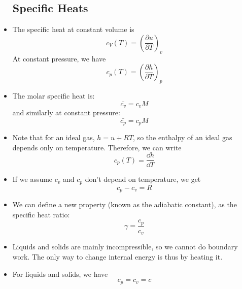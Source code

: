 \begin{itemize}
          \subsection{Specific Heats}
    \item The specific heat at constant volume is 
    \begin{equation}
        c_V(T) = \left(\frac{\partial u}{\partial T}\right)_{v}
    \end{equation}
    At constant pressure, we have 
    \begin{equation}
        c_p(T) = \left(\frac{\partial h}{\partial T}\right)_{p}
    \end{equation}
    \item The molar specific heat is: 
    \begin{equation}
        \bar{c_v} = c_vM
    \end{equation}
    and similarly at constant pressure: 
    \begin{equation}
        \bar{c_p} = c_pM
    \end{equation}
    \item Note that for an ideal gas, $h=u+RT$, so the enthalpy of an ideal gas depends only on temperature. Therefore, we can write 
    \begin{equation}
        c_p(T) = \frac{\dd{h}}{\dd{T}}
    \end{equation}
    \item If we assume $c_v$ and $c_p$ don't depend on temperature, we get 
    \begin{equation}
        c_p - c_v = R
    \end{equation}
    \item We can define a new property (known as the adiabatic constant), as the specific heat ratio: 
    \begin{equation}
        \gamma = \frac{c_p}{c_v}
    \end{equation}
    \item Liquids and solids are mainly incompressible, so we cannot do boundary work. The only way to change internal energy is thus by heating it.
    \item For liquids and solids, we have
    \begin{equation}
        c_p = c_v = c
    \end{equation}
\end{itemize}